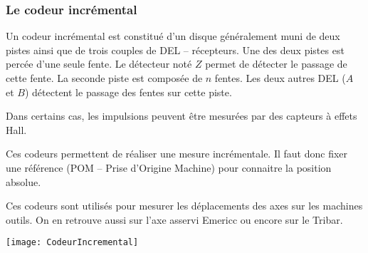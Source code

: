 \subsubsection{Le codeur incrémental}
\begin{minipage}[c]{.75\linewidth}
Un codeur incrémental est constitué d'un disque généralement muni de deux pistes ainsi que de trois couples de DEL -- récepteurs. Une des deux pistes est percée d'une seule fente. Le détecteur noté $Z$ permet de détecter le passage de cette fente. La seconde piste est composée de $n$ fentes. Les deux autres DEL ($A$ et $B$) détectent le passage des fentes sur cette piste. 

Dans certains cas, les impulsions peuvent être mesurées par des capteurs à effets Hall. 

Ces codeurs permettent de réaliser une mesure incrémentale. Il faut donc fixer une référence (POM -- Prise d'Origine Machine) pour connaitre la position absolue.

Ces codeurs sont utilisés pour mesurer les déplacements des axes sur les machines outils. On en retrouve aussi sur l'axe asservi Emericc ou encore sur le Tribar.
\end{minipage}\hfill
\begin{minipage}[c]{.2\linewidth}
\begin{center}
\texttt{[image: CodeurIncremental]}
\end{center}
\end{minipage}

